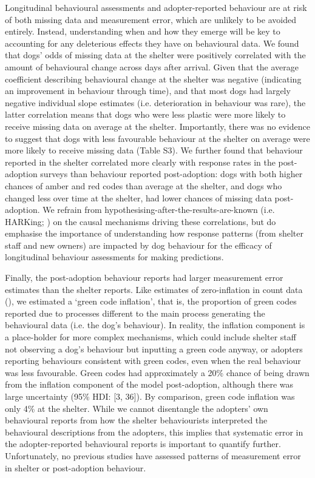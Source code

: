 \documentclass[12pt]{article}
\begin{document}
Longitudinal behavioural assessments and adopter-reported behaviour are at risk of both missing data and measurement error, which are unlikely to be avoided entirely. Instead, understanding when and how they emerge will be key to accounting for any deleterious effects they have on behavioural data. We found that dogs' odds of missing data at the shelter were positively correlated with the amount of behavioural change across days after arrival. Given that the average coefficient describing behavioural change at the shelter was negative (indicating an improvement in behaviour through time), and that most dogs had largely negative individual slope estimates (i.e. deterioration in behaviour was rare), the latter correlation means that dogs who were less plastic were more likely to receive missing data on average at the shelter. Importantly, there was no evidence to suggest that dogs with less favourable behaviour at the shelter on average were more likely to receive missing data (Table S3). We further found that behaviour reported in the shelter correlated more clearly with response rates in the post-adoption surveys than behaviour reported post-adoption: dogs with both higher chances of amber and red codes than average at the shelter, and dogs who changed less over time at the shelter, had lower chances of missing data post-adoption. We refrain from hypothesising-after-the-results-are-known (i.e. HARKing; \cite{kerr1998}) on the causal mechanisms driving these correlations, but do emphasise the importance of understanding how response patterns (from shelter staff and new owners) are impacted by dog behaviour for the efficacy of longitudinal behaviour assessments for making predictions.

Finally, the post-adoption behaviour reports had larger measurement error estimates than the shelter reports. Like estimates of zero-inflation in count data (\cite{lambert1992}), we estimated a `green code inflation', that is, the proportion of green codes reported due to processes different to the main process generating the behavioural data (i.e. the dog's behaviour). In reality, the inflation component is a place-holder for more complex mechanisms, which could include shelter staff not observing a dog's behaviour but inputting a green code anyway, or adopters reporting behaviours consistent with green codes, even when the real behaviour was less favourable. Green codes had approximately a 20\% chance of being drawn from the inflation component of the model post-adoption, although there was large uncertainty (95\% HDI: [3, 36]). By comparison, green code inflation was only 4\% at the shelter. While we cannot disentangle the adopters' own behavioural reports from how the shelter behaviourists interpreted the behavioural descriptions from the adopters, this implies that systematic error in the adopter-reported behavioural reports is important to quantify further. Unfortunately, no previous studies have assessed patterns of measurement error in shelter or post-adoption behaviour.
\end{document}
